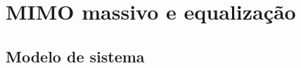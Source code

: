 %
%
%


\chapter{MIMO massivo e equalização}\label{chap:mimo-equalizacao}

\section{Modelo de sistema}\label{sec:sysmodel}

